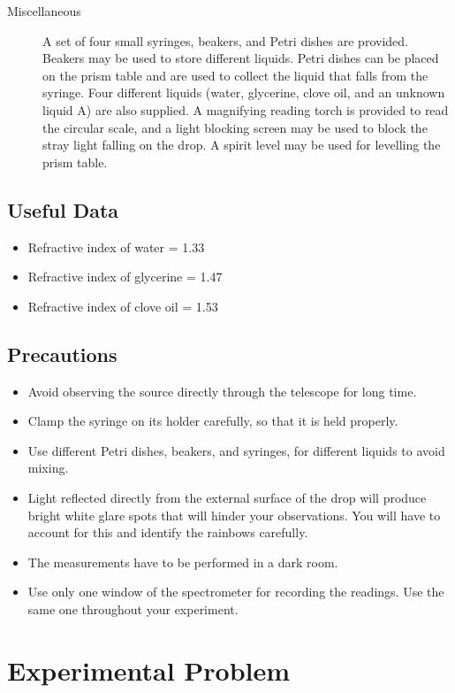 \begin{refsection}
\begin{description}
    \item[Miscellaneous]
    A set of four small syringes, beakers, and Petri dishes are provided. Beakers may be used to store different liquids. Petri dishes can be placed on the prism table and are used to collect the liquid that falls from the syringe. Four different liquids (water, glycerine, clove oil, and an unknown liquid A) are also supplied. A magnifying reading torch is provided to read the circular scale, and a light blocking screen may be used to block the stray light falling on the drop. A spirit level may be used for levelling the prism table.

\end{description}


\subsection*{Useful Data}
\begin{itemize}
    \item Refractive index of water = 1.33
    \item Refractive index of glycerine = 1.47
    \item Refractive index of clove oil = 1.53
\end{itemize}

\subsection*{Precautions}
\begin{itemize}
\item Avoid observing the source directly through the telescope for long time.
\item Clamp the syringe on its holder carefully, so that it is held properly.
\item Use different Petri dishes, beakers, and syringes, for different liquids to avoid mixing.
\item Light reflected directly from the external surface of the drop will produce bright white glare spots that will hinder your observations. You will have to account for this and identify the rainbows carefully. 
\item The measurements have to be performed in a dark room.
\item Use only one window of the spectrometer for recording the readings. Use the same one throughout your experiment.
\end{itemize}


\section*{Experimental Problem}

\end{refsection}
